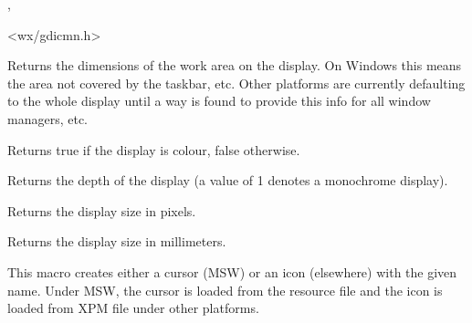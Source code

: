 
,


<wx/gdicmn.h>


\label{wxclientdisplayrect}



Returns the dimensions of the work area on the display.  On Windows
this means the area not covered by the taskbar, etc.  Other platforms
are currently defaulting to the whole display until a way is found to
provide this info for all window managers, etc.


\label{wxcolourdisplay}


Returns true if the display is colour, false otherwise.


\label{wxdisplaydepth}


Returns the depth of the display (a value of 1 denotes a monochrome display).


\label{wxdisplaysize}



Returns the display size in pixels.


\label{wxdisplaysizemm}



Returns the display size in millimeters.


\label{wxdropicon}


This macro creates either a cursor (MSW) or an icon (elsewhere) with the given
name. Under MSW, the cursor is loaded from the resource file and the icon is
loaded from XPM file under other platforms.

